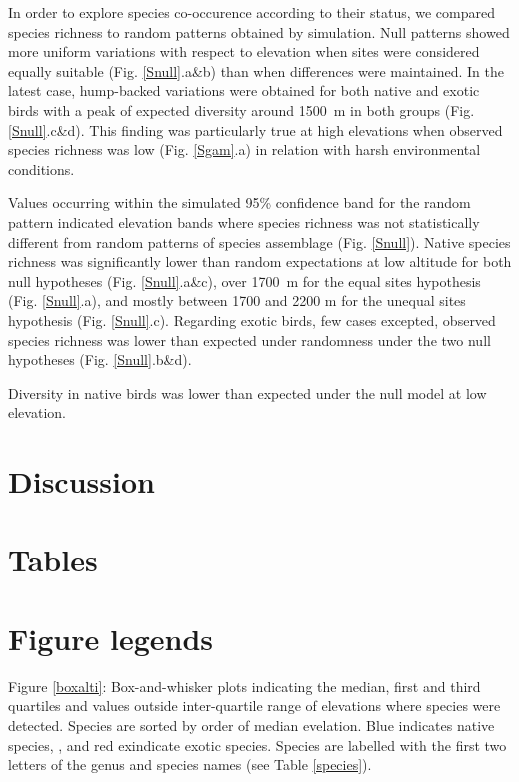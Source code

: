 \documentclass{article}
\begin{document}
In order to explore species co-occurence according to their status, we compared species richness to random patterns obtained by simulation. Null patterns showed more uniform variations with respect to elevation when sites were considered equally suitable (Fig. \ref{Snull}.a\&b) than when differences were maintained. In the latest case, hump-backed variations were obtained for both native and exotic birds with a peak of expected diversity around 1500~m in both groups (Fig. \ref{Snull}.c\&d). This finding was particularly true at high elevations when observed species richness was low (Fig. \ref{Sgam}.a) in relation with harsh environmental conditions.

Values occurring within the simulated 95\% confidence band for the random pattern indicated elevation bands where species richness was not statistically different from random patterns of species assemblage (Fig. \ref{Snull}). Native species richness was significantly lower than random expectations at low altitude for both null hypotheses (Fig. \ref{Snull}.a\&c), over 1700~m for the equal sites hypothesis (Fig. \ref{Snull}.a), and mostly between 1700 and 2200 m for the unequal sites hypothesis (Fig. \ref{Snull}.c). Regarding exotic birds, few cases excepted, observed species richness was lower than expected under randomness under the two null hypotheses (Fig. \ref{Snull}.b\&d).


Diversity in native birds was lower than expected under the null model at low elevation. 



\section*{Discussion}

\section*{Tables}



\section*{Figure legends}

Figure \ref{boxalti}: Box-and-whisker plots indicating the median, first and third quartiles and values outside inter-quartile range of elevations where species were detected. Species are sorted by order of median evelation. Blue indicates native species, , and red exindicate exotic species. Species are labelled with the first two letters of the genus and species names (see Table \ref{species}).
\end{document}
